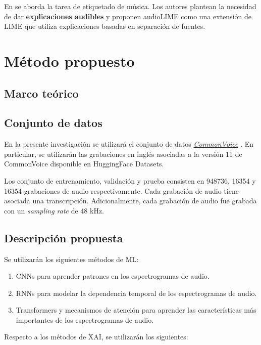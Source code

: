 \documentclass[conference]{IEEEtran}
\begin{document}
En \cite{DBLP:journals/corr/abs-2008-00582} se aborda la tarea de etiquetado de música. Los autores plantean la necesidad de dar \textbf{explicaciones audibles} y proponen audioLIME como una extensión de LIME que utiliza explicaciones basadas en separación de fuentes.

\section{Método propuesto}

\subsection{Marco teórico}

\subsection{Conjunto de datos}

En la presente investigación se utilizará el conjunto de datos \href{https://commonvoice.mozilla.org/en/datasets}{\textit{CommonVoice}} \cite{commonvoice:2020}. En particular, se utilizarán las grabaciones en inglés asociadas a la versión 11 de CommonVoice disponible en HuggingFace Datasets.

Los conjunto de entrenamiento, validación y prueba consisten en 948736, 16354 y 16354 grabaciones de audio respectivamente. Cada grabación de audio tiene asociada una transcripción. Adicionalmente, cada grabación de audio fue grabada con un \textit{sampling rate} de 48 kHz.

\subsection{Descripción propuesta}

Se utilizarán los siguientes métodos de ML:

\begin{enumerate}
    \item CNNs para aprender patrones en los espectrogramas de audio.
    \item RNNs para modelar la dependencia temporal de los espectrogramas de audio.
    \item Transformers y mecanismos de atención \cite{vaswani2023attention} para aprender las características más importantes de los espectrogramas de audio.
\end{enumerate}

Respecto a los métodos de XAI, se utilizarán los siguientes:
\end{document}
